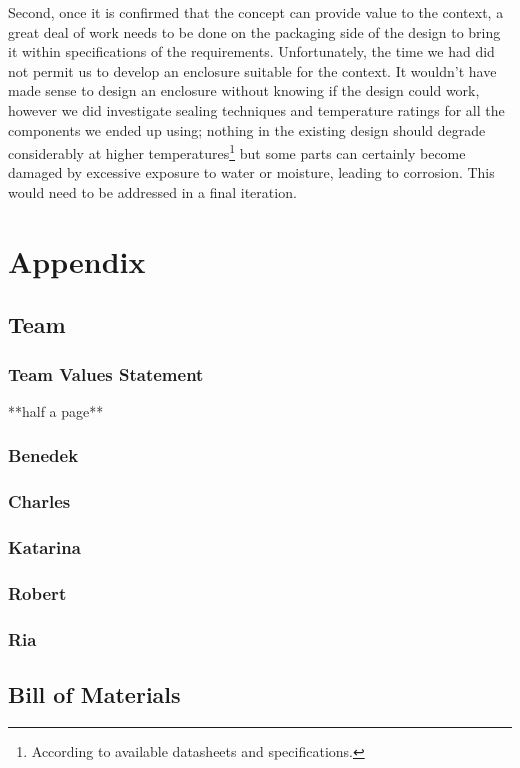 \documentclass[12pt]{article}
\begin{document}
\begin{multicols*}{2}
            Second, once it is confirmed that the concept can provide value to the context, a great deal of work needs to be done on the packaging side of the design to bring it within specifications of the requirements. Unfortunately, the time we had did not permit us to develop an enclosure suitable for the context. It wouldn't have made sense to design an enclosure without knowing if the design could work, however we did investigate sealing techniques and temperature ratings for all the components we ended up using; nothing in the existing design should degrade considerably at higher temperatures\footnote{According to available datasheets and specifications.} but some parts can certainly become damaged by excessive exposure to water or moisture, leading to corrosion. This would need to be addressed in a final iteration. 

    \newpage

    
    

    \newpage

    \section{Appendix}
        \subsection{Team}
            \subsubsection{Team Values Statement} \label{subsubsec:TVS}
                **half a page**

            \subsubsection{Benedek}

            \subsubsection{Charles}

            \subsubsection{Katarina}

            \subsubsection{Robert}

            \subsubsection{Ria}

            
        \subsection{Bill of Materials}


\end{multicols*}
\end{document}
